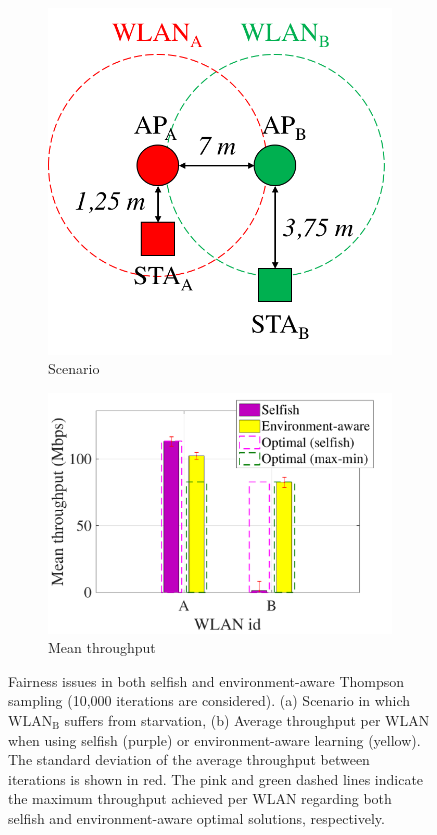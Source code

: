 \documentclass[preprint,12pt]{elsarticle}
\begin{document}
\begin{figure}[h!]
	\centering   		
	\begin{subfigure}[b]{0.3\textwidth}
		\includegraphics[width=\textwidth]{s1_new}
		\caption{Scenario}
		\label{fig:s1_new}
	\end{subfigure}
	\begin{subfigure}[b]{0.4\linewidth}
		\includegraphics[width=\textwidth]{selfish_vs_informed_sim_2_1}
		\caption{Mean throughput}\label{fig:scenario_1_new}
	\end{subfigure}
	\caption{Fairness issues in both selfish and environment-aware Thompson sampling (10,000 iterations are considered). (a) Scenario in which $\text{WLAN}_\text{B}$ suffers from starvation, (b) Average throughput per WLAN when using selfish (purple) or environment-aware learning (yellow). The standard deviation of the average throughput between iterations is shown in red. The pink and green dashed lines indicate the maximum throughput achieved per WLAN regarding both selfish and environment-aware optimal solutions, respectively.}
	\label{fig:selfish_learning_fairness_issue}
\end{figure}   		 
\end{document}

